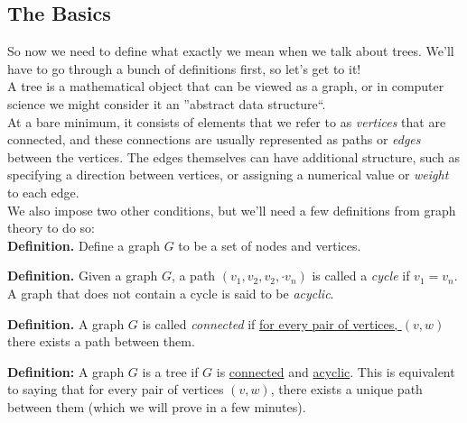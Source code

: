 \documentclass[a4paper,10pt]{report}
\begin{document}
\subsection{The Basics}
So now we need to define what exactly we mean when we talk about trees. We'll have to go through a bunch of definitions first, so let's get to it!\\

A tree is a mathematical object that can be viewed as a graph, or in computer science we might consider it an ''abstract data structure``.\\

At a bare minimum, it consists of elements that we refer to as \textit{vertices} that are connected, and these connections are usually represented as paths or \textit{edges} between the vertices. The edges themselves can have additional structure, such as specifying a direction between vertices, or assigning a numerical value or \textit{weight} to each edge.\\

We also impose two other conditions, but we'll need a few definitions from graph theory to do so:\\

\textbf{Definition.} Define a graph $G$ to be a set of nodes and vertices.

\textbf{Definition.} Given a graph $G$, a path $(v_1, v_2, v_2, \cdot v_n)$ is called a \textit{cycle} if $v_1 = v_n$. A graph that does not contain a cycle is said to be \textit{acyclic}.

\textbf{Definition.} A graph $G$ is called \textit{connected} if \underline{for every pair of vertices, $(v,w)$} there exists a path between them.

\textbf{Definition:}  A graph $G$ is a tree if $G$ is \underline{connected} and \underline{acyclic}. This is equivalent to saying that for every pair of vertices $(v,w)$, there exists a unique path between them (which we will prove in a few minutes).
\end{document}

